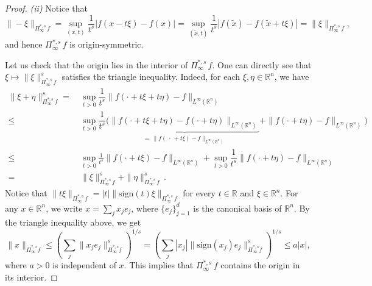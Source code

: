 \documentclass[11pt, reqno]{article}
\theoremstyle{definition}
\numberwithin{equation}{section}
\newcommand{\R}{\mathbb{R}}
\begin{document}
\begin{proof}
    \medskip
    
    \textit{(ii)} 
    Notice that 
    \[
        \| - \xi \|_{\Pi^{\ast, s}_\infty \, f} = \sup_{(x, t)} \dfrac{1}{t^s} |f(x - t\xi) - f(x)| = \sup_{(\tilde x, t)} \dfrac{1}{t^s} |f(\tilde x) - f(\tilde x + t\xi)| = \| \xi \|_{\Pi^{\ast, s}_\infty \, f},
    \]
    and hence $\Pi^{\ast, s}_\infty \, f$ is origin-symmetric.
    
    \medskip

    Let us check that the origin lies in the interior of $\Pi^{\ast, s}_\infty \, f$.
    One can directly see that $\xi \mapsto \| \xi \|_{\Pi^{\ast, s}_\infty \, f}^s$ satisfies the triangle inequality.
    Indeed, for each $\xi, \eta \in \R^n$, we have
    \begin{align*}
        \| \xi + \eta \|_{\Pi^{\ast, s}_\infty \, f}^s 
        = & ~ 
        \sup_{t > 0}
        \dfrac{1}{t^s} \| f(\cdot + t\xi + t\eta) - f \|_{L^\infty(\R^n)} \\
        \leq & ~
        \sup_{t > 0} 
        \dfrac{1}{t^s} \Big(
        \underbrace{\| f(\cdot + t\xi + t\eta) - f(\cdot + t \eta) \|_{L^\infty(\R^n)}}_{ = \, \| f(~\cdot~ + t\xi) - f \|_{L^\infty(\R^n)}} 
        + 
        \| f(\cdot + t\eta) - f \|_{L^\infty(\R^n)} 
        \Big) 
        \\
        \leq & ~ 
        \sup_{t > 0} \frac{1}{t^s} \| f(\cdot + t\xi) - f \|_{L^\infty(\R^n)} + \sup_{t > 0} \dfrac{1}{t^s}\| f(\cdot + t\eta) - f \|_{L^\infty(\R^n)} \\
        = & ~
        \| \xi \|^s_{\Pi^{\ast, s}_\infty \, f} 
        + \| \eta \|^s_{\Pi^{\ast, s}_\infty \, f} \,.
    \end{align*}
 	Notice that $\| t \xi \|_{\Pi^{\ast, s}_\infty \, f} = |t| \| \mathrm{sign}(t)\xi \|_{\Pi^{\ast, s}_\infty \, f}$ for every $t \in \R$ and $\xi \in \R^n$.
 	For any $x \in \R^n$, we write $x = \textstyle\sum_j x_j e_j$, where $\{ e_j \}_{j = 1}^d$ is the canonical basis of $\R^n$.
 	By the triangle inequality above, we get
 	\begin{equation}\label{origin-interior}
 		\| x \|_{\Pi^{\ast, s}_\infty f} \leq \left( \sum_j \| x_j e_j \|_{\Pi^{\ast, s}_\infty f}^s \right)^{1/s} = \left( \sum_j |x_j| \| \mathrm{sign}(x_j) e_j \|^s_{\Pi^{\ast, s}_\infty f}  \right)^{1/s} \leq a |x|,
 	\end{equation}
where $a > 0$ is independent of $x$. 
	This implies that $\Pi^{\ast, s}_\infty \, f$ contains the origin in its interior.


\end{proof}
\end{document}
